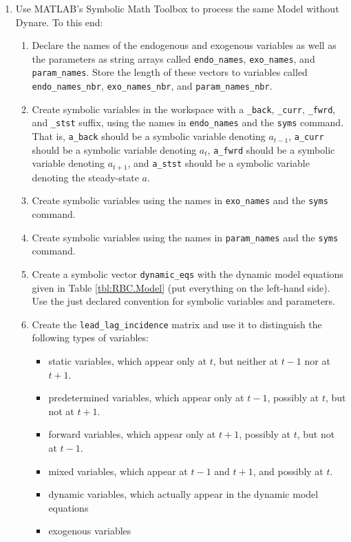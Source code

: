 \begin{enumerate}
\item Use MATLAB's Symbolic Math Toolbox to process the same Model without Dynare. To this end:
	\begin{enumerate}
	\item Declare the names of the endogenous and exogenous variables as well as the parameters as string arrays called
		\texttt{endo\_names}, \texttt{exo\_names}, and \texttt{param\_names}.
 		Store the length of these vectors to variables called \texttt{endo\_names\_nbr}, \texttt{exo\_names\_nbr}, and \texttt{param\_names\_nbr}.
	\item Create symbolic variables in the workspace with a \texttt{\_back}, \texttt{\_curr}, \texttt{\_fwrd}, and \texttt{\_stst} suffix,
	    using the names in \texttt{endo\_names} and the \texttt{syms} command.
	  That is, \texttt{a\_back} should be a symbolic variable denoting $a_{t-1}$,
	    \texttt{a\_curr} should be a symbolic variable denoting $a_{t}$,
		\texttt{a\_fwrd} should be a symbolic variable denoting $a_{t+1}$,
		and \texttt{a\_stst} should be a symbolic variable denoting the steady-state $a$.
	\item Create symbolic variables using the names in \texttt{exo\_names} and the \texttt{syms} command.
    \item Create symbolic variables using the names in \texttt{param\_names} and the \texttt{syms} command.
    \item Create a symbolic vector \texttt{dynamic\_eqs} with the dynamic model equations given in Table \ref{tbl:RBC.Model} (put everything on the left-hand side).
    Use the just declared convention for symbolic variables and parameters.
	\item Create the \texttt{lead\_lag\_incidence} matrix and use it to distinguish the following types of variables:
 		\begin{itemize}
	 	\item static variables, which appear only at $t$, but neither at $t-1$ nor at $t+1$.
        \item predetermined variables, which appear only at $t-1$, possibly at $t$, but not at $t+1$.
        \item forward variables, which appear only at $t+1$, possibly at $t$, but not at $t-1$.
        \item mixed variables, which appear at $t-1$ and $t+1$, and possibly at $t$.
        \item dynamic variables, which actually appear in the dynamic model equations
        \item exogenous variables

\end{itemize}
\end{enumerate}
\end{enumerate}
